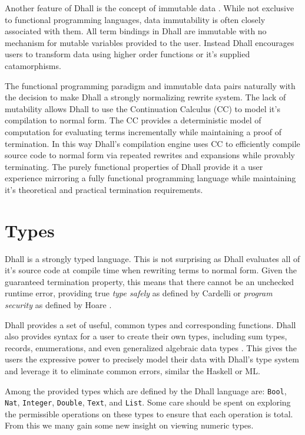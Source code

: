 \documentclass[12pt]{diazessay}
\newcommand{\Bool   }{\texttt{Bool}}
\newcommand{\Nat    }{\texttt{Nat}}
\newcommand{\Integer}{\texttt{Integer}}
\newcommand{\Double }{\texttt{Double}}
\newcommand{\List   }{\texttt{List}}
\begin{document}
Another feature of Dhall is the concept of immutable data \cite{driscoll1989making}.
While not exclusive to functional programming languages, data immutability is often closely associated with them.
All term bindings in Dhall are immutable with no mechanism for mutable variables provided to the user.
Instead Dhall encourages users to transform data using higher order functions or it's supplied catamorphisms.

The functional programming paradigm and immutable data pairs naturally with the decision to make Dhall a strongly normalizing rewrite system.
The lack of mutability allows Dhall to use the Continuation Calculus \cite{geron2013continuation} (CC) to model it's compilation to normal form.
The CC provides a deterministic model of computation for evaluating terms incrementally while maintaining a proof of termination.
In this way Dhall's compilation engine uses CC to efficiently compile source code to normal form via repeated rewrites and expansions while provably terminating.
The purely functional properties of Dhall provide it a user experience mirroring a fully functional programming language while maintaining it's theoretical and practical termination requirements.

\section*{Types}

Dhall is a strongly typed language.
This is not surprising as Dhall evaluates all of it's source code at compile time when rewriting terms to normal form.
Given the guaranteed termination property, this means that there cannot be an unchecked runtime error, providing true \emph{type safely} as defined by Cardelli \cite{cardelli1989typeful} or \emph{program security} as defined by Hoare \cite{hoare1973hints}.

Dhall provides a set of useful, common types and corresponding functions.
Dhall also provides syntax for a user to create their own types, including sum types, records, enumerations, and even generalized algebraic data types \cite{cheney2003first}.
This gives the users the expressive power to precisely model their data with Dhall's type system and leverage it to eliminate common errors, similar the Haskell or ML.

Among the provided types which are defined by the Dhall language are: \Bool{}, \Nat{}, \Integer{}, \Double{}, \texttt{Text}, and \List{}.
Some care should be spent on exploring the permissible operations on these types to ensure that each operation is total.
From this we many gain some new insight on viewing numeric types.
\end{document}
